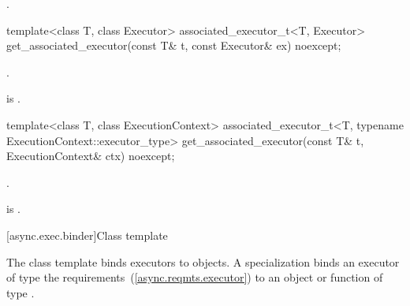 \begin{itemdescr}
\pnum
\returns {}.
\end{itemdescr}

\begin{itemdecl}
template<class T, class Executor>
  associated_executor_t<T, Executor>
    get_associated_executor(const T& t, const Executor& ex) noexcept;
\end{itemdecl}

\begin{itemdescr}
\pnum
\returns {}.

\pnum
{}
 is .
\end{itemdescr}

\begin{itemdecl}
template<class T, class ExecutionContext>
  associated_executor_t<T, typename ExecutionContext::executor_type>
    get_associated_executor(const T& t, ExecutionContext& ctx) noexcept;
\end{itemdecl}

\begin{itemdescr}
\pnum
\returns {}.

\pnum
{}
{\constraints{}}
 is .
\end{itemdescr}



[async.exec.binder]{Class template }

%
\pnum
The class template  binds executors to objects.
A specialization  binds
an executor of type   the  requirements~(\ref{async.reqmts.executor})
to an object or function of type .

